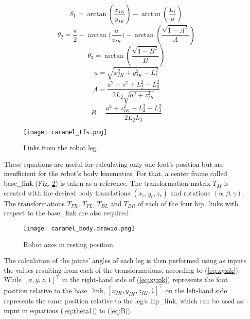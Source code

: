 \documentclass[conference]{IEEEtran}
\begin{document}
\begin{equation}
  \label{eq:theta1}
  \theta_1 = \arctan{(\frac{x_{IK}}{y_{IK}})} - \arctan{(\frac{L_1}{a})}
\end{equation}
\begin{equation}
  \label{eq:theta2}
  \theta_2 = \frac{\pi}{2} - \arctan{(\frac{a}{z_{IK}}}) - \arctan{(\frac{\sqrt{1-A^2}}{A})}
\end{equation}
\begin{equation}
  \label{eq:theta3}
  \theta_3 = \arctan(\frac{\sqrt{1-B^2}}{B})
\end{equation}
\begin{equation}
  \label{eq:a}
  a = \sqrt{x_{IK}^2+y_{IK}^2-L_1^2}
\end{equation}
\begin{equation}
  \label{eq:A}
  A =\frac{a^2+z^2+L_2^2-L_3^2}{2L_2\sqrt{a^2+z_{IK}^2}}
\end{equation}
\begin{equation}
  \label{eq:B}
  B = \frac{a^2+z_{IK}^2-L_2^2-L_3^2}{2L_2L_3}
\end{equation}

\begin{figure}[tb]
  \centering
  \texttt{[image: caramel\_tfs.png]}
  
  \caption{Links from the robot leg.}
  \label{fig:caramel_tfs}
\end{figure}

These equations are useful for calculating only one foot's position but are insufficient for the robot's body kinematics. For that, a center frame called base\_link (Fig. \ref{fig:caramel_body}) is taken as a reference. The transformation matrix $T_M$ is created with the desired body translations $(x_c, y_c, z_c)$ and rotations $(\alpha, \beta, \gamma)$. The transformations $T_{FR}$, $T_{FL}$, $T_{BL}$ and $T_{BR}$ of each of the four hip\_links with respect to the base\_link are also required.

\begin{figure}[tb]
  \centering
  \vspace{-0.75cm}
  \texttt{[image: caramel\_body.drawio.png]}
  
  \caption{Robot axes in resting position.}
  \label{fig:caramel_body}
  \vspace{-1.3\baselineskip}
\end{figure}

The calculation of the joints' angles of each leg is then performed using as inputs the values resulting from each of the transformations, according to (\ref{eq:xyzik}). While $[x, y, z, 1]^\top$ in the right-hand side of (\ref{eq:xyzik}) represents the foot position relative to the base\_link, $[x_{IK}, y_{IK}, z_{IK}, 1]^\top$ on the left-hand side represents the same position relative to the leg's hip\_link, which can be used as input in equations (\ref{eq:theta1}) to (\ref{eq:B}). 
\end{document}
